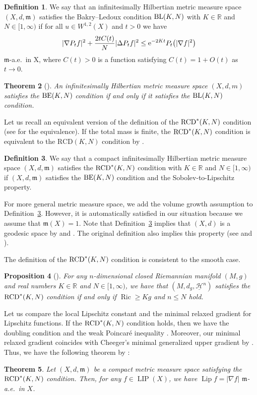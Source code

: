 \documentclass[pdftex]{sigma}
\numberwithin{equation}{section}
\newtheorem{Thm}{Theorem}[section]
\newtheorem{Prop}[Thm]{Proposition}
\theoremstyle{definition}
\newtheorem{Def}[Thm]{Definition}
\newcommand{\Ric}{\operatorname{Ric}}
\newcommand{\LIP}{\operatorname{LIP}}
\newcommand{\Lip}{\operatorname{Lip}}
\newcommand{\R}{\mathbb{R}}
\newcommand{\mf}{\mathfrak{m}}
\newcommand{\RCD}{{\rm RCD}^\ast}
\newcommand{\BE}{{\rm BE}}
\newcommand{\BL}{{\rm BL}}
\newcommand{\nHa}{\underline{\mathcal{H}}}
\begin{document}
\begin{Def}
We say that an infinitesimally Hilbertian metric measure space $(X,d,\mf)$ satis\-fies the Bakry--Ledoux condition $\BL(K,N)$ with $K\in\R$ and $N\in [1,\infty)$ if for all $u\in W^{1,2}(X)$ and $t>0$ we have
\[
|\nabla P_t f|^2+\frac{2t C(t)}{N}|\Delta P_t f|^2\leq {\rm e}^{-2Kt}P_t\big(|\nabla f|^2\big)
\]
$\mf$-a.e.\ in X, where $C(t)>0$ is a function satisfying $C(t)=1+O(t)$ as $t\to 0$.
\end{Def}
\begin{Thm}[{\cite[Theorem~4.8 and Proposition~4.9]{EKS}}]
An infinitesimally Hilbertian metric measure space $(X,d,m)$ satisfies the $\BE(K,N)$ condition if and only if it satisfies the $\BL(K,N)$ condition.
\end{Thm}
Let us recall an equivalent version of the definition of the $\RCD(K,N)$ condition (see \cite[Theorem~7 and~Definition~3.16]{EKS} for the equivalence).
If the total mass is finite, the $\RCD(K,N)$ condition is equivalent to the $\mathrm{RCD}(K,N)$ condition by \cite[Corollary~13.7]{CM}.

\begin{Def}\label{rcd}
We say that a compact infinitesimally Hilbertian metric measure space $(X,d,\mf)$ satisfies the $\RCD(K,N)$ condition with $K\in\R$ and $N\in [1,\infty)$ if $(X,d,\mf)$ satisfies the $\BE(K,N)$ condition and the Sobolev-to-Lipschitz property.
\end{Def}
For more general metric measure space, we add the volume growth assumption to Definition~\ref{rcd}. However, it is automatically satisfied in our situation because we assume that $\mf(X)=1$.
Note that Definition~\ref{rcd} implies that $(X,d)$ is a geodesic space by \cite[Theorems~3.9 and~3.10]{AGS3} and \cite[Theorem~2.5.23]{BBI}.
The original definition also implies this property (see \cite[Remark 3.8]{EKS} and \cite[Remark~4.6]{Stu1}).

The definition of the $\RCD(K,N)$ condition is consistent to the smooth case.
\begin{Prop}[{\cite[Proposition~4.21]{EKS}}]
For any $n$-dimensional closed Riemannian mani\-fold $(M,g)$ and real numbers $K\in \R$ and $N\in[1,\infty)$, we have that $(M,d_g, \nHa^n)$ satisfies the $\RCD(K,N)$ condition if and only if $\Ric\geq K g $ and $n\leq N$ hold.
\end{Prop}

Let us compare the local Lipschitz constant and the minimal relaxed gradient for Lipschitz functions.
If the $\RCD(K,N)$ condition holds, then we have the doubling condition \cite[Corollary~2.4]{Stu} and the weak Poincar\'{e} inequality \cite[Theorem~1.1]{Raj}.
Moreover, our minimal relaxed gradient coincides with Cheeger's minimal generalized upper gradient \cite[Definition~2.9]{Ch0} by \cite[Theorem~6.2]{AGS1}.
Thus, we have the following theorem by \cite[Theorem~6.1]{Ch0}:
\begin{Thm}
Let $(X,d,\mf)$ be a compact metric measure space satisfying the $\RCD(K,N)$ condition.
Then, for any $f\in \LIP(X)$, we have $\Lip f=|\nabla f|$ $\mf$-a.e.\ in $X$.
\end{Thm}
\end{document}

